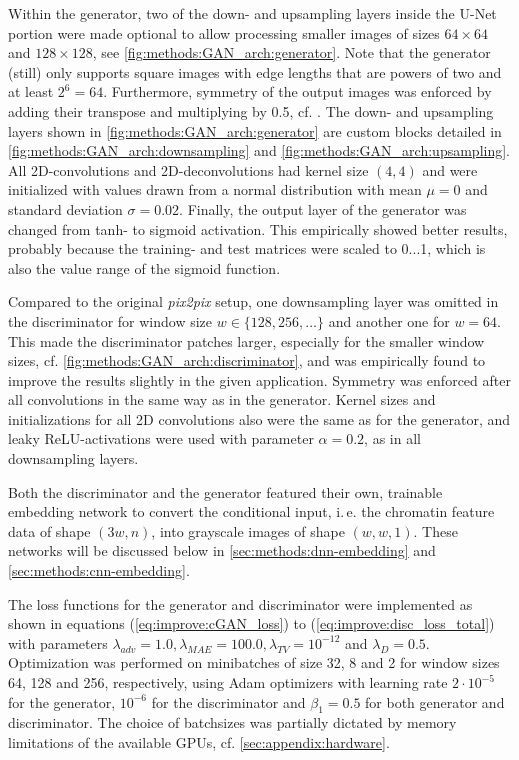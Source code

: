 Within the generator, two of the down- and upsampling layers inside the U-Net portion were made optional 
to allow processing smaller images of sizes $64\times64$ and $128\times128$, see \cref{fig:methods:GAN_arch:generator}.
Note that the generator (still) only supports square images with edge lengths that are powers of two and at least $2^6=64$.
Furthermore, symmetry of the output images was enforced by adding their transpose and multiplying by 0.5, cf. \cite{Fudenberg2020}.
The down- and upsampling layers shown in  \cref{fig:methods:GAN_arch:generator} are custom blocks 
detailed in \cref{fig:methods:GAN_arch:downsampling} and \ref{fig:methods:GAN_arch:upsampling}. 
All 2D-convolutions and 2D-deconvolutions had kernel size $(4,4)$ and were initialized with values drawn from a normal distribution with mean $\mu=0$ and
standard deviation $\sigma=0.02$.
Finally, the output layer of the generator was changed from tanh- to sigmoid activation.
This empirically showed better results, probably because the training- and test matrices were scaled to 0...1, which 
is also the value range of the sigmoid function.

Compared to the original \emph{pix2pix} setup, 
one downsampling layer was omitted in the discriminator for window size $w\in\{128,256,\dots\}$ and another one for $w=64$.
This made the discriminator patches larger, especially for the smaller window sizes,
cf. \cref{fig:methods:GAN_arch:discriminator}, and was empirically found to improve the results
slightly in the given application.
Symmetry was enforced after all convolutions in the same way as in the generator.
Kernel sizes and initializations for all 2D convolutions also were the same as for the generator,
and leaky ReLU-activations were used with parameter $\alpha=0.2$, as in all downsampling layers.

Both the discriminator and the generator featured their own, trainable embedding network
to convert the conditional input, i.\,e. the chromatin feature data of shape $(3w, n)$,
into grayscale images of shape $(w,w,1)$. 
These networks will be discussed below in \cref{sec:methods:dnn-embedding}
and \cref{sec:methods:cnn-embedding}.

The loss functions for the generator and discriminator were implemented as shown in equations (\ref{eq:improve:cGAN_loss}) to (\ref{eq:improve:disc_loss_total})
with parameters $\lambda_\mathit{adv}=1.0, \lambda_\mathit{MAE}=100.0, \lambda_\mathit{TV}=10^{-12}$ and $\lambda_D=0.5$.
Optimization was performed on minibatches of size 32, 8 and 2 for window sizes 64, 128 and 256, respectively, 
using Adam optimizers with learning rate $2\cdot10^{-5}$ for the generator, $10^{-6}$ for the discriminator and $\beta_1=0.5$ for both generator and discriminator.
The choice of batchsizes was partially dictated by memory limitations of the available GPUs, cf. \cref{sec:appendix:hardware}.

